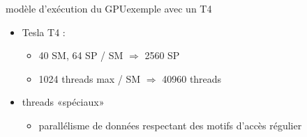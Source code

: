 \documentclass[11pt,mathserif]{beamer}
\begin{document}
\begin{frame}{modèle d'exécution du GPU}{exemple avec un T4}
\begin{minipage}[c]{0.69\linewidth}
  \begin{itemize}[<+->]
    \item Tesla T4 : 
      \begin{itemize}
        \item 40 SM, 64 SP / SM $\Rightarrow$ 2560 SP
        \item 1024 threads max / SM $\Rightarrow$ 40960 threads
      \end{itemize}
    \item threads «spéciaux»
      \begin{itemize}
        \item parallélisme de données respectant des motifs d'accès régulier
      \end{itemize}
  \end{itemize}
\end{minipage}
\begin{minipage}[c]{0.29\linewidth}
\begin{center}
\end{center}
\end{minipage}
\end{frame}
\end{document}
